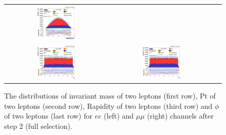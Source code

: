 \begin{figure}[ht]
\begin{center}
\begin{tabular}{ccc}
      \includegraphics[width=0.4\textwidth]{figures/tW/fig/Step2/mumu/H_Rll.png}\\
      \includegraphics[width=0.4\textwidth]{figures/tW/fig/Step2/ee/H_Ptll_phi.png}&
      \includegraphics[width=0.4\textwidth]{figures/tW/fig/Step2/mumu/H_Ptll_phi.png}\\
    \end{tabular}
    \caption{The distributions of invariant mass of two leptons (first row), Pt of two leptons (second row), Rapidity of two leptons (third row) and $\phi$ of two leptons (last row) for $ee$ (left) and $\mu\mu$ (right) channels after step 2 (full selection).
    \label{fig:step2_M_pt_R_phi}}
  \end{center}
\end{figure}


